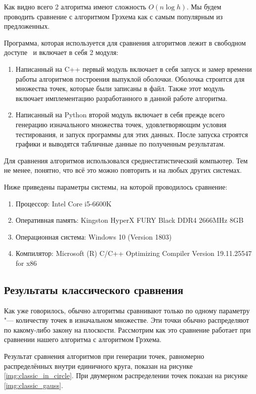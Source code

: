 Как видно всего 2 алгоритма имеют сложность $O(n \log h)$. Мы будем проводить сравнение с алгоритмом Грэхема как с самым популярным из предложенных.

Программа, которая используется для сравнения алгоритмов лежит в свободном доступе~\cite{matrokhin2017github} и включает в себя 2 модуля:
\begin{enumerate}
	\item Написанный на C++ первый модуль включает в себя запуск и замер времени работы алгоритмов построения выпуклой оболочки. Оболочка строится для множества точек, которые были записаны в файл. Также этот модуль включает имплементацию разработанного в данной работе алгоритма.
	\item Написанный на Python второй модуль включает в себя прежде всего генерацию изначального множества точек, удовлетворяющим условия тестирования, и запуск программы для этих данных. После запуска строятся графики и выводятся табличные данные по полученным результатам.
\end{enumerate}

Для сравнения алгоритмов использовался среднестатистический компьютер. Тем не менее, понятно, что всё это можно повторить и на любых других системах.

Ниже приведены параметры системы, на которой проводилось сравнение:
\begin{enumerate}
	\item Процессор: Intel Core i5-6600K
	\item Оперативная память: Kingston HyperX FURY Black DDR4 2666MHz 8GB
	\item Операционная система: Windows 10 (Version 1803)
	\item Компилятор: Microsoft (R) C/C++ Optimizing Compiler Version 19.11.25547 for x86
\end{enumerate}

\subsection{Результаты классического сравнения}

Как уже говорилось, обычно алгоритмы сравнивают только по одному параметру "--- количеству точек в изначальном множестве. Эти точки обычно распределяют по какому-либо закону на плоскости. Рассмотрим как это сравнение работает при сравнении нашего алгоритма с алгоритмом Грэхема.

Результат сравнения алгоритмов при генерации точек, равномерно распределённых внутри единичного круга, показан на рисунке \ref{img:classic_in_circle}. При двумерном распределении точек показан на рисунке \ref{img:classic_gauss}.

